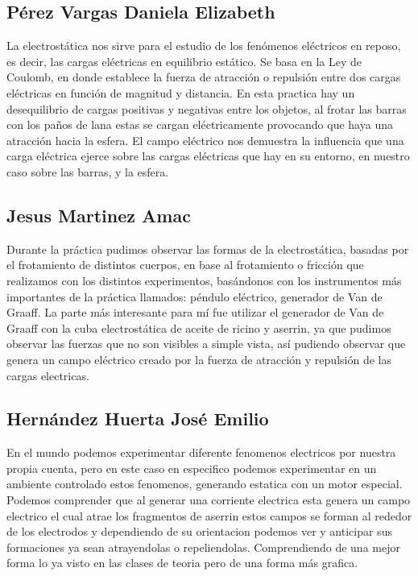 \documentclass[14pt]{article}
\begin{document}
\begin{multicols}{2}
\subsection{Pérez Vargas Daniela Elizabeth}
La electrostática nos sirve para el estudio de los fenómenos eléctricos en reposo, es decir, las cargas eléctricas en equilibrio estático. Se basa en la Ley de Coulomb, en donde establece la fuerza de atracción o repulsión entre dos cargas eléctricas en función de magnitud y distancia. En esta practica hay un desequilibrio de cargas positivas y negativas entre los objetos, al frotar las barras con los paños de lana estas se cargan eléctricamente provocando que haya una atracción hacia la esfera. El campo eléctrico nos demuestra la influencia que una carga eléctrica ejerce sobre las cargas eléctricas que hay en su entorno, en nuestro caso sobre las barras, y la esfera.
\subsection{Jesus Martinez Amac}

Durante la práctica pudimos observar las formas de la electrostática, basadas por el frotamiento de distintos cuerpos, en base al frotamiento o fricción que realizamos con los distintos experimentos, basándonos con los instrumentos más importantes de la práctica llamados: péndulo eléctrico, generador de Van de Graaff. La parte más interesante para mí fue utilizar el generador de Van de Graaff con la cuba electrostática de aceite de ricino y aserrin, ya que pudimos observar las fuerzas que no son visibles a simple vista, así pudiendo observar que genera un campo eléctrico creado por la fuerza de atracción y repulsión de las cargas electricas.

\subsection{Hernández Huerta José Emilio}
En el mundo podemos experimentar diferente fenomenos electricos por nuestra propia cuenta, pero en este caso en especifico podemos experimentar en un ambiente controlado estos fenomenos, generando estatica con un motor especial. 
Podemos comprender que al generar una corriente electrica esta genera un campo electrico el cual atrae los fragmentos de aserrin estos campos se forman al rededor de los electrodos y dependiendo de su orientacion podemos ver y anticipar sus formaciones ya sean atrayendolas o repeliendolas. Comprendiendo de una mejor forma lo ya visto en las clases de teoria pero de una forma más grafica.


\end{multicols}
\end{document}
